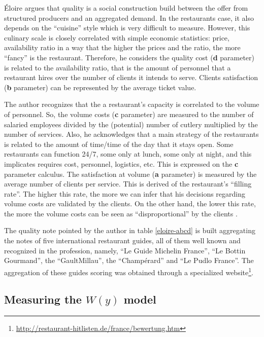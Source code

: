 \documentclass[a4paper, 12pt, openright, oneside, german, french, brazil, english]{abntex2}
\begin{document}
	Éloire argues that quality is a social construction build between the offer from structured producers and an aggregated demand. In the restaurants case, it also depends on the ``cuisine'' style which is very difficult to measure. However, this culinary scale is closely correlated with simple economic statistics: price, availability ratio in a way that the higher the prices and the ratio, the more ``fancy'' is the restaurant. Therefore, he considers the quality cost (\textbf{d} parameter) is related to the availability ratio, that is the amount of personnel that a restaurant hires over the number of clients it intends to serve. Clients satisfaction (\textbf{b} parameter) can be represented by the average ticket value.

        The author recognizes that the a restaurant's capacity is correlated to the volume of personnel. So, the volume costs (\textbf{c} parameter) are measured to the number of salaried employees divided by the (potential) number of cutlery multiplied by the number of services. Also, he acknowledges that a main strategy of the restaurants is related to the amount of time/time of the day that it stays open. Some restaurants can function 24/7, some only at lunch, some only at night,  and this implicates requires cost, personnel, logistics, etc. This is expressed on the \textbf{c} parameter calculus. The satisfaction at volume (\textbf{a} parameter) is measured by the average number of clients per service. This is derived of the restaurant's ``filling rate''. The higher this rate, the more we can infer that his decisions regarding volume costs are validated by the clients. On the other hand, the lower this rate, the more the volume costs can be seen as ``disproportional'' by the clients \cite{eloire2009reseaux}.

        The quality note pointed by the author in table \ref{eloire-abcd} is built aggregating the notes of five international restaurant guides, all of them well known and recognized in the profession, namely, ``Le Guide Michelin France'', ``Le Bottin Gourmand'', the ``GaultMillau'', the ``Champérard'' and ``Le Pudlo France''. The aggregation of these guides scoring was obtained through a specialized website\footnote{\url{http://restaurant-hitlisten.de/france/bewertung.htm}}.
        
	
	
         
        \subsection{Measuring the $W(y)$ model}
\end{document}
